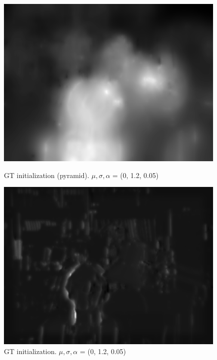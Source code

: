 \documentclass[11pt]{article} %
\begin{document}
    \begin{figure}[ht]
  \centering
  \begin{minipage}[b]{0.45\textwidth}
    \includegraphics[width=\textwidth]{output7.png}
    \caption{GT initialization (pyramid). $\mu, \sigma, \alpha$ = (0, 1.2, 0.05)}
    \label{fig:image1}
  \end{minipage}
  \hfill
  \begin{minipage}[b]{0.45\textwidth}
    \includegraphics[width=\textwidth]{output9.png}
    \caption{GT initialization. $\mu, \sigma, \alpha$ = (0, 1.2, 0.05)}
    \label{fig:image2}
  \end{minipage}
  \end{figure}
  
	
\end{document}
